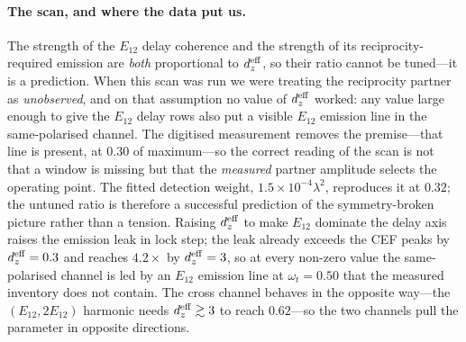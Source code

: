 \documentclass[11pt]{article}
\begin{document}
\paragraph{The scan, and where the data put us.}
The strength of the $E_{12}$ delay coherence and the strength of its
reciprocity-required emission are \emph{both} proportional to
$d_z^{\rm eff}$, so their ratio cannot be tuned---it is a prediction.
When this scan was run we were treating the reciprocity partner as
\emph{unobserved}, and on that assumption no value of
$d_z^{\rm eff}$ worked: any value large enough to give the $E_{12}$
delay rows also put a visible $E_{12}$ emission line in the
same-polarised channel.  The digitised measurement removes the
premise---that line is present, at $0.30$ of maximum---so the correct
reading of the scan is not that a window is missing but that the
\emph{measured} partner amplitude selects the operating point.  The
fitted detection weight, $1.5\times10^{-4}\lambda^2$, reproduces it at
$0.32$; the untuned ratio is therefore a successful prediction of the
symmetry-broken picture rather than a tension.  Raising
$d_z^{\rm eff}$ to make $E_{12}$ dominate the delay axis raises the
emission leak in lock step; the leak already exceeds the CEF peaks by
$d_z^{\rm eff}=0.3$ and reaches $4.2\times$ by $d_z^{\rm eff}=3$, so at
every non-zero value the same-polarised channel is led by an $E_{12}$
emission line at $\omega_t=0.50$ that the measured inventory does not
contain.  The cross channel behaves in the opposite way---the
$(E_{12},2E_{12})$ harmonic needs $d_z^{\rm eff}\gtrsim3$ to reach
$0.62$---so the two channels pull the parameter in opposite directions.
\end{document}
